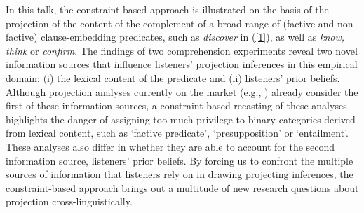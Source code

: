 \documentclass[12pt,fleqn]{article}
\newcommand{\6}{\mbox{$[\hspace*{-.6mm}[$}}
\newcommand{\9}{\mbox{$]\hspace*{-.6mm}]$}}
\begin{document}
\noindent
In this talk, the constraint-based approach is illustrated on the basis of the projection of the content of the complement of a broad range of (factive and non-factive) clause-embedding predicates, such as {\em discover} in (\ref{1}), as well as {\em  know, think} or {\em confirm}. The findings of two comprehension experiments reveal two novel information sources that influence listeners' projection inferences in this empirical domain: (i) the lexical content of the predicate and (ii) listeners' prior beliefs. Although projection analyses currently on the market (e.g., \citealt{abusch10,abrusan2011,heim83,best-question,schlenker-ms}) already consider the first of these information sources, a constraint-based recasting of these analyses highlights the danger of assigning too much privilege to binary categories derived from lexical content, such as `factive predicate', `presupposition' or `entailment'. These analyses also differ in whether they are able to account for the second information source, listeners' prior beliefs. By forcing us to confront the multiple sources of information that listeners rely on in drawing projecting inferences, the constraint-based approach brings out a multitude of new research questions about projection cross-linguistically.


\end{document}

